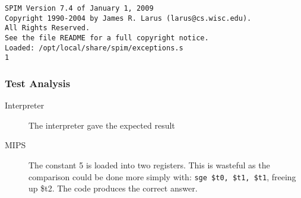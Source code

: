 \begin{verbatim}
SPIM Version 7.4 of January 1, 2009
Copyright 1990-2004 by James R. Larus (larus@cs.wisc.edu).
All Rights Reserved.
See the file README for a full copyright notice.
Loaded: /opt/local/share/spim/exceptions.s
1
\end{verbatim}
\subsubsection{Test Analysis}
\begin{description}
	\item[Interpreter] The interpreter gave the expected result
	\item[MIPS] The constant 5 is loaded into two registers. This is wasteful as the comparison could be done more simply with: \verb!sge $t0, $t1, $t1!, freeing up \$t2. The code produces the correct answer.
\end{description}
